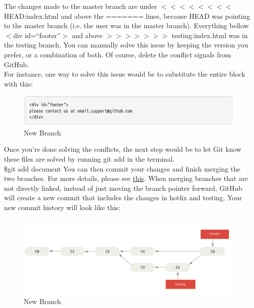 \documentclass{article}
\begin{document}
    The changes made to the master branch are under $<<<<<<<<$ HEAD:index.html and above the ======= lines, because HEAD was pointing to the master branch (i.e. the user was in the master branch). Everything bellow $<$div id=``footer''$>$ and above  $>>>>>>>$ testing:index.html was in the testing branch. You can manually solve this issue by keeping the version you prefer, or a combination of both. Of course, delete the conflict signals from GitHub. \\
    \indent For instance, one way to solve this issue would be to substitute the entire block with this:
    \begin{figure}[H]
    	\caption{New Branch}
    	\includegraphics[scale=0.5]{images/figure11.png}
    	\centering
    \end{figure} 
    Once you're done solving the conflicts, the next step would be to let Git know these files are solved by running git add in the terminal. \\
    \newline
    \indent \$git add document
    \newline
    \newline
    You can then commit your changes and finish merging the two branches.
    For more details, please see \href{https://git-scm.com/book/en/v2/Git-Branching-Basic-Branching-and-Merging}{this}.
    When merging branches that are not directly linked, instead of just moving the branch pointer forward, GitHub will create a new commit that includes the changes in hotfix and testing. Your new commit history will look like this:
    \begin{figure}[H]
    	\caption{New Branch}
    	\includegraphics[scale=0.5]{images/figure12.png}
    	\centering
    \end{figure} 
\end{document}
